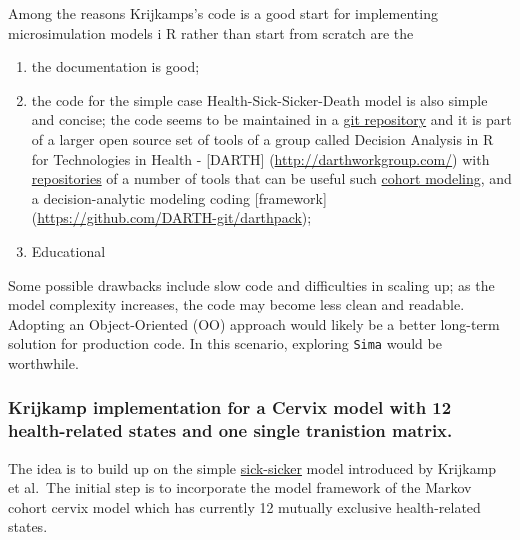 \documentclass[
]{article}
\begin{document}
Among the reasons Krijkamps's code is a good start for implementing
microsimulation models i R rather than start from scratch are the

\begin{enumerate}
\def\labelenumi{\alph{enumi})}
\item
  the documentation is good;
\item
  the code for the simple case Health-Sick-Sicker-Death model is also
  simple and concise; the code seems to be maintained in a
  \href{https://github.com/DARTH-git/Microsimulation-tutorial}{git
  repository} and it is part of a larger open source set of tools of a
  group called Decision Analysis in R for Technologies in Health -
  {[}DARTH{]} (\url{http://darthworkgroup.com/}) with
  \href{https://github.com/DARTH-git}{repositories} of a number of tools
  that can be useful such
  \href{https://github.com/DARTH-git/Cohort-modeling-tutorial}{cohort
  modeling}, and a decision-analytic modeling coding {[}framework{]}
  (\url{https://github.com/DARTH-git/darthpack});
\item
  Educational
\end{enumerate}

Some possible drawbacks include slow code and difficulties in scaling
up; as the model complexity increases, the code may become less clean
and readable. Adopting an Object-Oriented (OO) approach would likely be
a better long-term solution for production code. In this scenario,
exploring \texttt{Sima} would be worthwhile.

\hypertarget{krijkamp-implementation-for-a-cervix-model-with-12-health-related-states-and-one-single-tranistion-matrix.}{%
\subsubsection{Krijkamp implementation for a Cervix model with 12
health-related states and one single tranistion
matrix.}\label{krijkamp-implementation-for-a-cervix-model-with-12-health-related-states-and-one-single-tranistion-matrix.}}

The idea is to build up on the simple
\href{https://github.com/DARTH-git/Microsimulation-tutorial}{sick-sicker}
model introduced by Krijkamp et al.~The initial step is to incorporate
the model framework of the Markov cohort cervix model which has
currently 12 mutually exclusive health-related states.
\end{document}
